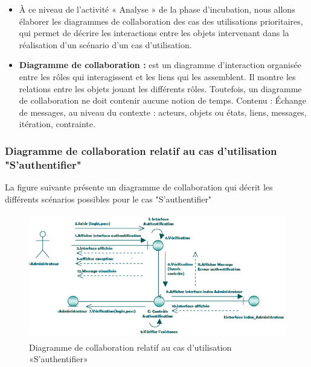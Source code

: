 \documentclass[12 pt]{report}
\begin{document}
\begin{itemize}[font=\color{black} \Large, label=]
\item À ce niveau de l’activité « Analyse » de la phase d’incubation, nous allons élaborer les diagrammes de collaboration des cas des utilisations prioritaires, qui permet de décrire les interactions entre les
objets intervenant dans la réalisation d’un scénario d’un cas d’utilisation.
\item  \textbf{Diagramme de collaboration :} est un diagramme d’interaction organisée entre les
rôles qui interagissent et les liens qui les assemblent. Il montre les relations entre les objets jouant les différents rôles. Toutefois, un diagramme de collaboration ne doit contenir aucune notion de temps. Contenu : Échange de messages, au niveau du contexte :
acteurs, objets ou états, liens, messages, itération, contrainte.
\end{itemize}
\newpage
\subsubsection{Diagramme de collaboration relatif au cas d’utilisation "S’authentifier" }
La figure suivante présente un diagramme de collaboration qui décrit les différents
scénarios possibles pour le cas "S'authentifier"
\begin{figure}[h]
\begin{center}
\includegraphics[width= 14cm , height =5.5cm]{colla_adm_authentification.png}
\caption{Diagramme de collaboration relatif au cas d’utilisation «S’authentifier»}
\end{center}
\end{figure}
\end{document}
